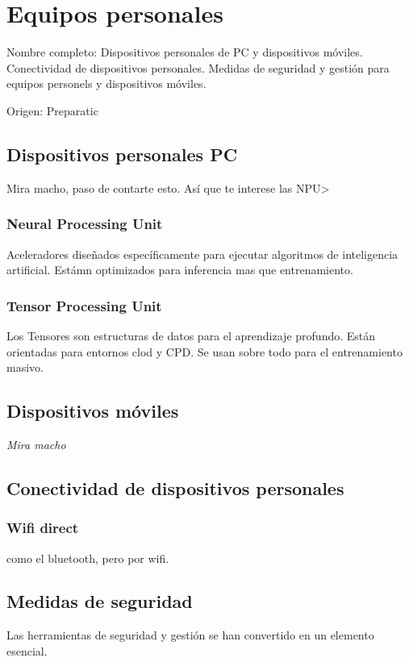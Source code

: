 \setcounter{section}{53}
\section{Equipos personales}

Nombre completo: Dispositivos personales de PC y dispositivos móviles. Conectividad de dispositivos personales. Medidas de seguridad y gestión para equipos personels y dispositivos móviles.

Origen: Preparatic

\localtableofcontents

\subsection{Dispositivos personales PC}
Mira macho, paso de contarte esto. Así que te interese las NPU>

\subsubsection{Neural Processing Unit}
Aceleradores diseñados específicamente para ejecutar algoritmos de inteligencia artificial. Estámn optimizados para inferencia mas que entrenamiento. 

\subsubsection{Tensor Processing Unit}
Los Tensores son estructuras de datos para el aprendizaje profundo. Están orientadas para entornos clod y CPD. Se usan sobre todo para el entrenamiento masivo.

\subsection{Dispositivos móviles}

\textit{Mira macho}

\subsection{Conectividad de dispositivos personales}

\subsubsection{Wifi direct}
como el bluetooth, pero por wifi.

\subsection{Medidas de seguridad}
Las herramientas de seguridad y gestión se han convertido en un elemento esencial.

